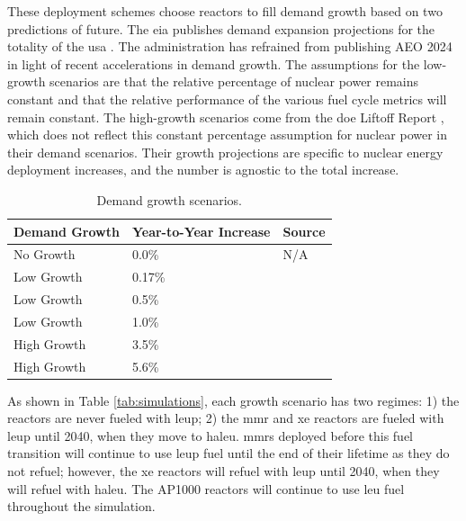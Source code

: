 These deployment schemes choose reactors to fill demand growth based on two predictions of future. The \gls{eia} publishes demand expansion projections for the totality of the \gls{usa} \cite{eia_aeo_2023}. The administration has refrained from publishing AEO 2024 in light of recent accelerations in demand growth. The assumptions for the low-growth scenarios are that the relative percentage of nuclear power remains constant and that the relative performance of the various fuel cycle metrics will remain constant. The high-growth scenarios come from the \gls{doe} Liftoff Report \cite{julie_liftoff_pathways_2024}, which does not reflect this constant percentage assumption for nuclear power in their demand scenarios. Their growth projections are specific to nuclear energy deployment increases, and the number is agnostic to the total increase.

\begin{table}[H]
    \centering
    \caption{Demand growth scenarios.}
    \label{tab:demand_scenarios}
    \begin{tabular}{l l l}
        \hline
        \textbf{Demand Growth} & \textbf{Year-to-Year Increase} & \textbf{Source}\\
        \hline
        No Growth & 0.0\% & N/A\\
        Low Growth & 0.17\% & \cite{eia_aeo_2023}\\
        Low Growth & 0.5\% & \cite{eia_aeo_2023}\\
        Low Growth & 1.0\% & \cite{eia_aeo_2023}\\
        High Growth & 3.5\% & \cite{julie_liftoff_pathways_2024} \\
        High Growth & 5.6\% & \cite{julie_liftoff_pathways_2024}\\
        \hline
    \end{tabular}
  \end{table}

As shown in Table \ref{tab:simulations}, each growth scenario has two regimes: 1) the reactors are never fueled with \gls{leup}; 2) the \gls{mmr} and \gls{xe} reactors are fueled with \gls{leup} until 2040, when they move to \gls{haleu}. \glspl{mmr} deployed before this fuel transition will continue to use \gls{leup} fuel until the end of their lifetime as they do not refuel; however, the \gls{xe} reactors will refuel with \gls{leup} until 2040, when they will refuel with \gls{haleu}. The AP1000 reactors will continue to use \gls{leu} fuel throughout the simulation.

